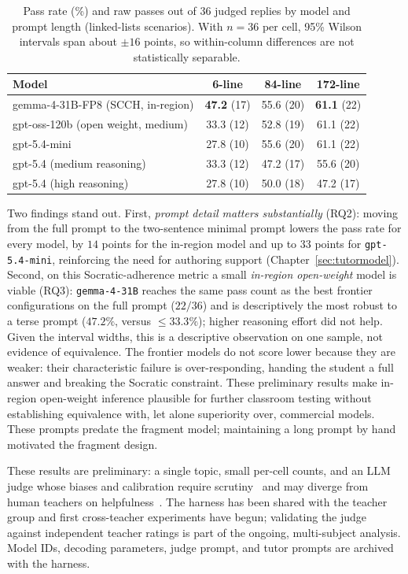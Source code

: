 \documentclass[runningheads]{llncs}
\begin{document}
\begin{table}[t]
\centering
\caption{Pass rate (\%) and raw passes out of 36 judged replies by model and prompt length (linked-lists scenarios). With $n=36$ per cell, 95\% Wilson intervals span about $\pm16$ points, so within-column differences are not statistically separable.}
\label{tab:harness}
\begin{tabular}{lccc}
\toprule
\textbf{Model} & \textbf{6-line} & \textbf{84-line} & \textbf{172-line} \\
\midrule
gemma-4-31B-FP8 (SCCH, in-region) & \textbf{47.2} (17) & 55.6 (20) & \textbf{61.1} (22) \\
gpt-oss-120b (open weight, medium) & 33.3 (12) & 52.8 (19) & 61.1 (22) \\
gpt-5.4-mini & 27.8 (10) & 55.6 (20) & 61.1 (22) \\
gpt-5.4 (medium reasoning) & 33.3 (12) & 47.2 (17) & 55.6 (20) \\
gpt-5.4 (high reasoning) & 27.8 (10) & 50.0 (18) & 47.2 (17) \\
\bottomrule
\end{tabular}
\end{table}

Two findings stand out. First, \emph{prompt detail matters substantially} (RQ2): moving from the full prompt to the two-sentence minimal prompt lowers the pass rate for every model, by $14$ points for the in-region model and up to $33$ points for \texttt{gpt-5.4-mini}, reinforcing the need for authoring support (Chapter~\ref{sec:tutormodel}). Second, on this Socratic-adherence metric a small \emph{in-region open-weight} model is viable (RQ3): \texttt{gemma-4-31B} reaches the same pass count as the best frontier configurations on the full prompt ($22/36$) and is descriptively the most robust to a terse prompt ($47.2\%$, versus $\le 33.3\%$); higher reasoning effort did not help. Given the interval widths, this is a descriptive observation on one sample, not evidence of equivalence. The frontier models do not score lower because they are weaker: their characteristic failure is over-responding, handing the student a full answer and breaking the Socratic constraint. These preliminary results make in-region open-weight inference plausible for further classroom testing without establishing equivalence with, let alone superiority over, commercial models. These prompts predate the fragment model; maintaining a long prompt by hand motivated the fragment design.

These results are preliminary: a single topic, small per-cell counts, and an LLM judge whose biases and calibration require scrutiny~\cite{zheng2023judging} and may diverge from human teachers on helpfulness~\cite{tack2022aiteacher}. The harness has been shared with the teacher group and first cross-teacher experiments have begun; validating the judge against independent teacher ratings is part of the ongoing, multi-subject analysis. Model IDs, decoding parameters, judge prompt, and tutor prompts are archived with the harness.
\end{document}
